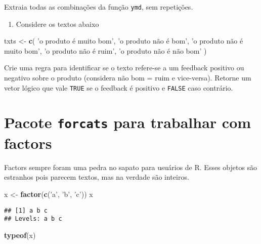 \documentclass[]{book}
\newenvironment{Shaded}{\begin{snugshade}}{\end{snugshade}}
\newcommand{\KeywordTok}[1]{\textcolor[rgb]{0.13,0.29,0.53}{\textbf{{#1}}}}
\newcommand{\StringTok}[1]{\textcolor[rgb]{0.31,0.60,0.02}{{#1}}}
\newcommand{\NormalTok}[1]{{#1}}
\providecommand{\tightlist}{%
  \setlength{\itemsep}{0pt}\setlength{\parskip}{0pt}}
\begin{document}
Extraia todas as combinações da função \texttt{ymd}, sem repetições.

\begin{enumerate}
\def\labelenumi{\arabic{enumi}.}
\setcounter{enumi}{1}
\tightlist
\item
  Considere os textos abaixo
\end{enumerate}

\begin{Shaded}
\begin{Highlighting}[]
\NormalTok{txts <-}\StringTok{ }\KeywordTok{c}\NormalTok{(}
  \StringTok{'o produto é muito bom'}\NormalTok{,}
  \StringTok{'o produto não é bom'}\NormalTok{,}
  \StringTok{'o produto não é muito bom'}\NormalTok{,}
  \StringTok{'o produto não é ruim'}\NormalTok{,}
  \StringTok{'o produto não é não bom'}
\NormalTok{)}
\end{Highlighting}
\end{Shaded}

Crie uma regra para identificar se o texto refere-se a um feedback
positivo ou negativo sobre o produto (considera não bom = ruim e
vice-versa). Retorne um vetor lógico que vale \texttt{TRUE} se o
feedback é positivo e \texttt{FALSE} caso contrário.

\section{\texorpdfstring{Pacote \texttt{forcats} para trabalhar com
factors}{Pacote forcats para trabalhar com factors}}\label{pacote-forcats-para-trabalhar-com-factors}

Factors sempre foram uma pedra no sapato para usuários de R. Esses
objetos são estranhos pois parecem textos, mas na verdade são inteiros.

\begin{Shaded}
\begin{Highlighting}[]
\NormalTok{x <-}\StringTok{ }\KeywordTok{factor}\NormalTok{(}\KeywordTok{c}\NormalTok{(}\StringTok{'a'}\NormalTok{, }\StringTok{'b'}\NormalTok{, }\StringTok{'c'}\NormalTok{))}
\NormalTok{x}
\end{Highlighting}
\end{Shaded}

\begin{verbatim}
## [1] a b c
## Levels: a b c
\end{verbatim}

\begin{Shaded}
\begin{Highlighting}[]
\KeywordTok{typeof}\NormalTok{(x)}
\end{Highlighting}
\end{Shaded}
\end{document}
